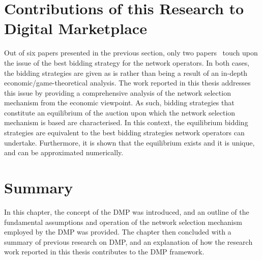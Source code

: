 \section{Contributions of this Research to Digital Marketplace} %
\label{sec:contributions_of_this_research_to_digital_marketplace_dmp}
Out of six papers presented in the previous section, only two papers~\cite{DMLeBodic00,DMIrvine01} touch upon the issue of the best bidding strategy for the network operators. In both cases, the bidding strategies are given as is rather than being a result of an in-depth economic/game-theoretical analysis. The work reported in this thesis addresses this issue by providing a comprehensive analysis of the network selection mechanism from the economic viewpoint. As such, bidding strategies that constitute an equilibrium of the auction upon which the network selection mechanism is based are characterised. In this context, the equilibrium bidding strategies are equivalent to the best bidding strategies network operators can undertake. Furthermore, it is shown that the equilibrium exists and it is unique, and can be approximated numerically.

\section{Summary} %
\label{sec:summary_dmp}
In this chapter, the concept of the DMP was introduced, and an outline of the fundamental assumptions and operation of the network selection mechanism employed by the DMP was provided. The chapter then concluded with a summary of previous research on DMP, and an explanation of how the research work reported in this thesis contributes to the DMP framework.
